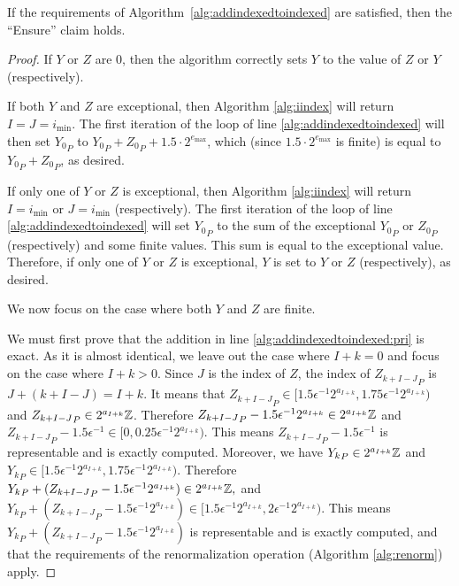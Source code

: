     \begin{lem}
      If the requirements of Algorithm~\ref{alg:addindexedtoindexed} are satisfied, then the ``Ensure'' claim holds.
      \label{lem:reduce}
    \end{lem}
    \begin{proof}
      If $Y$ or $Z$ are 0, then the algorithm correctly sets $Y$ to the value of $Z$ or $Y$ (respectively).

      If both $Y$ and $Z$ are exceptional, then Algorithm \ref{alg:iindex} will return $I = J = i_{\min}$. The first iteration of the loop of line \ref{alg:addindexedtoindexed} will then set ${Y_{0}}_P$ to ${Y_{0}}_P + {Z_{0}}_P + 1.5 \cdot 2^{e_{\max}}$, which (since $1.5 \cdot 2^{e_{\max}}$ is finite) is equal to ${Y_{0}}_P + {Z_{0}}_P$, as desired.

      If only one of $Y$ or $Z$ is exceptional, then Algorithm \ref{alg:iindex} will return $I = i_{\min}$ or $J = i_{\min}$ (respectively). The first iteration of the loop of line \ref{alg:addindexedtoindexed} will set ${Y_{0}}_P$ to the sum of the exceptional ${Y_0}_P$ or ${Z_0}_P$ (respectively) and some finite values. This sum is equal to the exceptional value. Therefore, if only one of $Y$ or $Z$ is exceptional, $Y$ is set to $Y$ or $Z$ (respectively), as desired.

      We now focus on the case where both $Y$ and $Z$ are finite.

      We must first prove that the addition in line \ref{alg:addindexedtoindexed:pri} is exact. As it is almost identical, we leave out the case where $I + k = 0$ and focus on the case where $I + k > 0$.
      Since $J$ is the index of $Z$, the index of ${Z_{k + I-J}}_P$ is
      $J + (k + I -J) = I + k$. It means that
      \(
        {Z_{k + I-J}}_P \in [1.5 \epsilon^{-1} 2^{a_{I+k}}, 1.75 \epsilon^{-1} 2^{a_{I+k}})
      \)
      and ${Z_{k + I-J}}_P \in 2^{a_{I+k}} \mathbb{Z}$.
      Therefore ${Z_{k + I-J}}_P - 1.5 \epsilon^{-1}  2^{a_{I+k}} \in 2^{a_{I+k}} \mathbb{Z}$
      and ${Z_{k + I-J}}_P - 1.5 \epsilon^{-1} \in [0, 0.25 \epsilon^{-1} 2^{a_{I+k}})$.
      This means ${Z_{k + I-J}}_P - 1.5 \epsilon^{-1}$ is representable and is
      exactly computed.
      Moreover, we have ${Y_{k}}_P \in 2^{a_{I+k}} \mathbb{Z}$ and
      \(
        {Y_{k}}_P \in [1.5 \epsilon^{-1} 2^{a_{I+k}}, 1.75 \epsilon^{-1} 2^{a_{I+k}})
      \).
      Therefore
      \(
        {Y_{k}}_P + ({Z_{k + I-J}}_P - 1.5 \epsilon^{-1}  2^{a_{I+k}})
          \in 2^{a_{I+k}} \mathbb{Z},
      \)
      and
      \(
        {Y_{k}}_P + ({Z_{k + I-J}}_P - 1.5 \epsilon^{-1}  2^{a_{I+k}})
          \in [1.5 \epsilon^{-1} 2^{a_{I+k}}, 2 \epsilon^{-1} 2^{a_{I+k}})
      \).
      This means ${Y_{k}}_P + ({Z_{k + I-J}}_P - 1.5 \epsilon^{-1}  2^{a_{I+k}})$
      is representable and is exactly computed, and that the requirements of the renormalization operation (Algorithm \ref{alg:renorm}) apply.


\end{proof}
